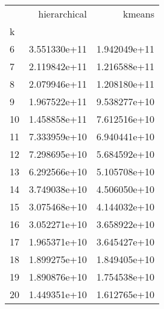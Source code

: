 \begin{tabular}{lrr}
	\toprule
	{} & hierarchical & kmeans       \\
	k  &              &              \\
	\midrule
	6  & 3.551330e+11 & 1.942049e+11 \\
	7  & 2.119842e+11 & 1.216588e+11 \\
	8  & 2.079946e+11 & 1.208180e+11 \\
	9  & 1.967522e+11 & 9.538277e+10 \\
	10 & 1.458858e+11 & 7.612516e+10 \\
	11 & 7.333959e+10 & 6.940441e+10 \\
	12 & 7.298695e+10 & 5.684592e+10 \\
	13 & 6.292566e+10 & 5.105708e+10 \\
	14 & 3.749038e+10 & 4.506050e+10 \\
	15 & 3.075468e+10 & 4.144032e+10 \\
	16 & 3.052271e+10 & 3.658922e+10 \\
	17 & 1.965371e+10 & 3.645427e+10 \\
	18 & 1.899275e+10 & 1.849405e+10 \\
	19 & 1.890876e+10 & 1.754538e+10 \\
	20 & 1.449351e+10 & 1.612765e+10 \\
	\bottomrule
\end{tabular}
